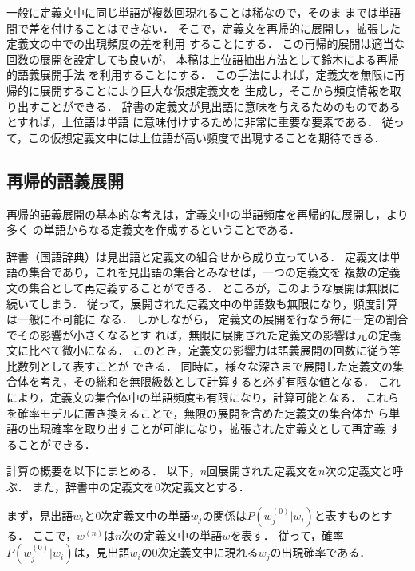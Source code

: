 \documentclass[japanese]{jnlp_1.4}
\begin{document}
一般に定義文中に同じ単語が複数回現れることは稀なので，そのま
までは単語間で差を付けることはできない．
そこで，定義文を再帰的に展開し，拡張した定義文の中での出現頻度の差を利用
することにする．
この再帰的展開は適当な回数の展開を設定しても良いが，
本稿は上位語抽出方法として鈴木による再帰的語義展開手法
\cite{Suzuki2,Suzuki3j}を利用することにする．
この手法によれば，定義文を無限に再帰的に展開することにより巨大な仮想定義文を
生成し，そこから頻度情報を取り出すことができる．
辞書の定義文が見出語に意味を与えるためのものであるとすれば，上位語は単語
に意味付けするために非常に重要な要素である．
従って，この仮想定義文中には上位語が高い頻度で出現することを期待できる．


\subsection{再帰的語義展開}
\label{sec:method}


再帰的語義展開の基本的な考えは，定義文中の単語頻度を再帰的に展開し，より多く
の単語からなる定義文を作成するということである． 

辞書（国語辞典）は見出語と定義文の組合せから成り立っている．
定義文は単語の集合であり，これを見出語の集合とみなせば，一つの定義文を
複数の定義文の集合として再定義することができる．
ところが，このような展開は無限に続いてしまう．
従って，展開された定義文中の単語数も無限になり，頻度計算は一般に不可能に
なる．
しかしながら，
定義文の展開を行なう毎に一定の割合でその影響が小さくなるとす
れば，無限に展開された定義文の影響は元の定義文に比べて微小になる．
このとき，定義文の影響力は語義展開の回数に従う等比数列として表すことが
できる．
同時に，様々な深さまで展開した定義文の集合体を考え，その総和を無限級数として計算すると必ず有限な値となる．
これにより，定義文の集合体中の単語頻度も有限になり，計算可能となる．
これらを確率モデルに置き換えることで，無限の展開を含めた定義文の集合体か
ら単語の出現確率を取り出すことが可能になり，拡張された定義文として再定義
することができる．

計算の概要を以下にまとめる．
以下，$n$回展開された定義文を$n$次の定義文と呼ぶ．
また，辞書中の定義文を0次定義文とする．

まず，見出語$w_i$と0次定義文中の単語$w_j$の関係は$P(w_j^{(0)}|w_i)$と表すものとする．
ここで，$w^{(n)}$は$n$次の定義文中の単語$w$を表す．
従って，確率$P(w_j^{(0)}|w_i)$は，見出語$w_i$の0次定義文中に現れる$w_j$の出現確率である．
\end{document}
